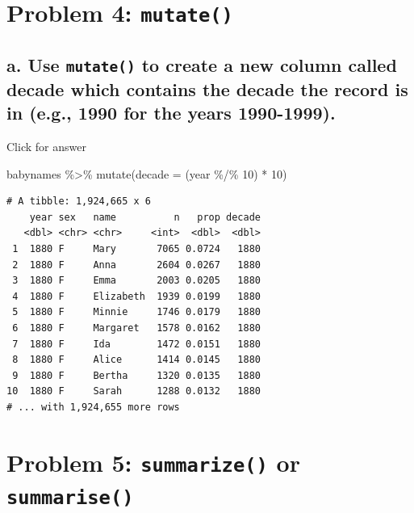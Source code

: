 \documentclass[
]{book}
\newenvironment{Shaded}{\begin{snugshade}}{\end{snugshade}}
\newcommand{\AttributeTok}[1]{\textcolor[rgb]{0.77,0.63,0.00}{#1}}
\newcommand{\DecValTok}[1]{\textcolor[rgb]{0.00,0.00,0.81}{#1}}
\newcommand{\FunctionTok}[1]{\textcolor[rgb]{0.00,0.00,0.00}{#1}}
\newcommand{\NormalTok}[1]{#1}
\newcommand{\SpecialCharTok}[1]{\textcolor[rgb]{0.00,0.00,0.00}{#1}}
\begin{document}
\hypertarget{problem-4-mutate}{%
\section{\texorpdfstring{Problem 4: \texttt{mutate()}}{Problem 4: mutate()}}\label{problem-4-mutate}}

\hypertarget{a.-use-mutate-to-create-a-new-column-called-decade-which-contains-the-decade-the-record-is-in-e.g.-1990-for-the-years-1990-1999.}{%
\subsection{\texorpdfstring{a. Use \texttt{mutate()} to create a new column called decade which contains the decade the record is in (e.g., 1990 for the years 1990-1999).}{a. Use mutate() to create a new column called decade which contains the decade the record is in (e.g., 1990 for the years 1990-1999).}}\label{a.-use-mutate-to-create-a-new-column-called-decade-which-contains-the-decade-the-record-is-in-e.g.-1990-for-the-years-1990-1999.}}

Click for answer

\begin{Shaded}
\begin{Highlighting}[]
\NormalTok{babynames }\SpecialCharTok{\%\textgreater{}\%} \FunctionTok{mutate}\NormalTok{(}\AttributeTok{decade =}\NormalTok{ (year }\SpecialCharTok{\%/\%} \DecValTok{10}\NormalTok{) }\SpecialCharTok{*} \DecValTok{10}\NormalTok{)}
\end{Highlighting}
\end{Shaded}

\begin{verbatim}
# A tibble: 1,924,665 x 6
    year sex   name          n   prop decade
   <dbl> <chr> <chr>     <int>  <dbl>  <dbl>
 1  1880 F     Mary       7065 0.0724   1880
 2  1880 F     Anna       2604 0.0267   1880
 3  1880 F     Emma       2003 0.0205   1880
 4  1880 F     Elizabeth  1939 0.0199   1880
 5  1880 F     Minnie     1746 0.0179   1880
 6  1880 F     Margaret   1578 0.0162   1880
 7  1880 F     Ida        1472 0.0151   1880
 8  1880 F     Alice      1414 0.0145   1880
 9  1880 F     Bertha     1320 0.0135   1880
10  1880 F     Sarah      1288 0.0132   1880
# ... with 1,924,655 more rows
\end{verbatim}

\hypertarget{problem-5-summarize-or-summarise}{%
\section{\texorpdfstring{Problem 5: \texttt{summarize()} or \texttt{summarise()}}{Problem 5: summarize() or summarise()}}\label{problem-5-summarize-or-summarise}}
\end{document}
